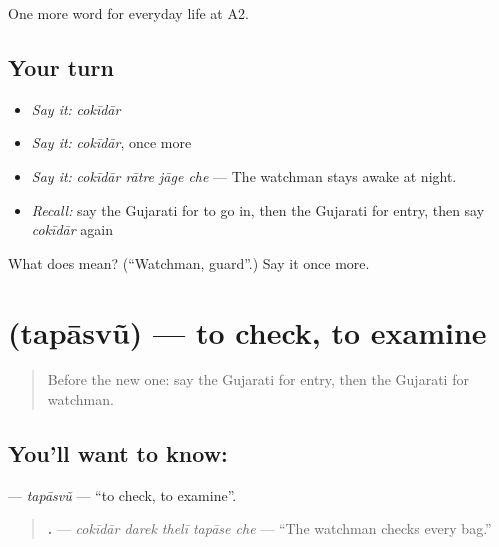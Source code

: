 \begin{grammarlens}[title={What you've built}]
One more word for everyday life at A2.
\end{grammarlens}

\subsection*{Your turn}
\begin{itemize}
\raggedright
  \item \emph{Say it:} \emph{cokīdār}
  \item \emph{Say it:} \emph{cokīdār}, once more
  \item \emph{Say it:} \emph{cokīdār rātre jāge che} — The watchman stays awake at night.
  \item \emph{Recall:} say the Gujarati for to go in, then the Gujarati for entry, then say \emph{cokīdār} again
\end{itemize}

\begin{tcolorbox}[breakable,colback=teal!4,colframe=teal!35!black,title={Before you move on}]
What does  mean? (\textquotedblleft{}Watchman, guard\textquotedblright{}.) Say it once more.
\end{tcolorbox}
\section[\texorpdfstring{\gu{તપાસવું} (tapāsvũ)}{તપાસવું (tapāsvũ)}]{ (tapāsvũ) — to check, to examine}

\label{lesson:GU-C197-tapasvu}



\begin{quote}
Before the new one: say the Gujarati for entry, then the Gujarati for watchman.
\end{quote}

\subsection*{You'll want to know: }
\textbf{} — \emph{tapāsvũ} — \textquotedblleft{}to check, to examine\textquotedblright{}.

\begin{quote}
\textbf{    .} — \emph{cokīdār darek thelī tapāse che} — \textquotedblleft{}The watchman checks every bag.\textquotedblright{}
\end{quote}

